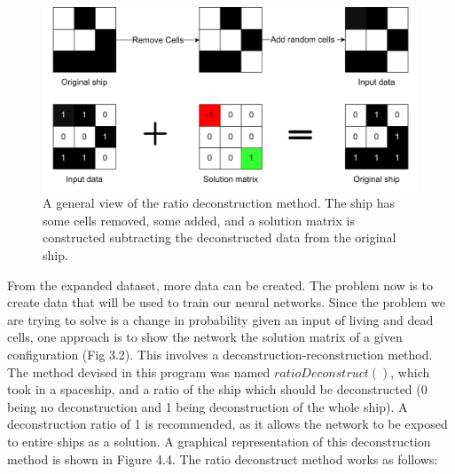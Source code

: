 \documentclass{l4proj}
\begin{document}
\begin{figure}[h]
\centering
\includegraphics[width=\textwidth]{dissertation/images/diagrams/data_augmentation.jpg} 
\caption{A general view of the ratio deconstruction method. The ship has some cells removed, some added, and a solution matrix is constructed subtracting the deconstructed data from the original ship.}
\label{fig:subim1}
\end{figure}

From the expanded dataset, more data can be created. The problem now is to create data that will be used to train our neural networks. Since the problem we are trying to solve is a change in probability given an input of living and dead cells, one approach is to show the network the solution matrix of a given configuration (Fig 3.2). This involves a deconstruction-reconstruction method. The method devised in this program was named $ratioDeconstruct()$, which took in a spaceship, and a ratio of the ship which should be deconstructed (0 being no deconstruction and 1 being deconstruction of the whole ship). A deconstruction ratio of 1 is recommended, as it allows the network to be exposed to entire ships as a solution. A graphical representation of this deconstruction method is shown in Figure 4.4. The ratio deconstruct method works as follows:
\end{document}
